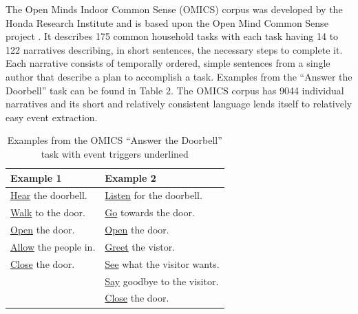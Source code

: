 \documentclass[letterpaper]{article}
\begin{document}
The Open Minds Indoor Common Sense (OMICS) corpus was developed by the Honda Research Institute and is based upon the Open Mind Common Sense project \cite{gupta2004common}. It describes 175 common household tasks with each task having 14 to 122 narratives describing, in short sentences, the necessary steps to complete it.  Each narrative consists of temporally ordered, simple sentences from a single author that describe a plan to accomplish a task.  Examples from the ``Answer the Doorbell'' task can be found in Table 2. The OMICS corpus has 9044 individual narratives and its short and relatively consistent language lends itself to relatively easy event extraction. %


\begin{table}
\footnotesize
\begin{center}
\begin{tabular}{| l | l |}
\hline
Example 1 & Example 2 \\
\hline
\underline{Hear} the doorbell. & \underline{Listen} for the doorbell. \\
\underline{Walk} to the door. & \underline{Go} towards the door. \\
\underline{Open} the door. & \underline{Open} the door. \\
\underline{Allow} the people in. & \underline{Greet} the vistor. \\
\underline{Close} the door. & \underline{See} what the visitor wants. \\
& \underline{Say} goodbye to the visitor. \\
& \underline{Close} the door. \\
\hline
\end{tabular}
\vspace{-0.79mm}
\caption{Examples from the OMICS ``Answer the Doorbell'' task with event triggers underlined}
\end{center}
\label{table:omicsexample}
\end{table}
\end{document}
